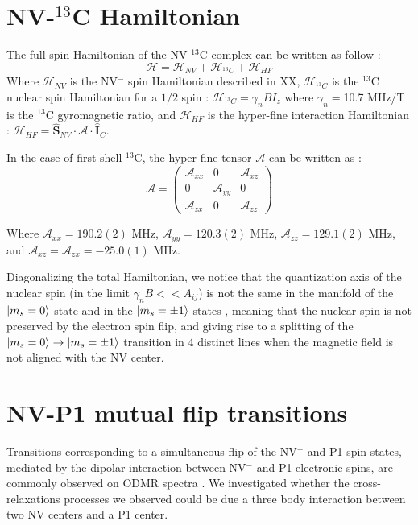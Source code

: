 \documentclass{article}
\begin{document}
\section{NV-$^{13}$C Hamiltonian}
The full spin Hamiltonian of the NV-$^{13}$C complex can be written as follow : 
\begin{equation*}
\mathcal{H}=\mathcal{H}_{NV}+\mathcal{H}_{^{13}C}+\mathcal{H}_{HF}
\end{equation*}
Where $\mathcal{H}_{NV}$ is the NV$^-$ spin Hamiltonian described in XX, $\mathcal{H}_{^{13}C}$ is the $^{13}$C nuclear spin Hamiltonian for a $1/2$ spin : $\mathcal{H}_{^{13}C}=\gamma_{n} B I_z$ where $\gamma_{n}=$10.7 MHz/T is the $^{13}$C gyromagnetic ratio, and $\mathcal{H}_{HF}$ is the hyper-fine interaction Hamiltonian : $\mathcal{H}_{HF}= \hat{\mathbf{S}}_{NV} \cdot \mathcal{A} \cdot \hat{\mathbf{I}}_C$.

In the case of first shell $^{13}$C, the hyper-fine tensor $\mathcal{A}$ can be written as \citep{simanovskaia_sidebands_2013} : $$ \mathcal{A} = \begin{pmatrix}
\mathcal{A}_{xx} & 0 & \mathcal{A}_{xz} \\ 0 & \mathcal{A}_{yy} & 0 \\ \mathcal{A}_{zx} & 0 & \mathcal{A}_{zz}
\end{pmatrix} $$

Where $\mathcal{A}_{xx}=190.2(2)$ MHz, $\mathcal{A}_{yy}=120.3(2)$ MHz, $\mathcal{A}_{zz}=129.1(2)$ MHz, and  $\mathcal{A}_{xz}=\mathcal{A}_{zx}=-25.0(1)$ MHz. 

Diagonalizing the total Hamiltonian, we notice that the quantization axis of the nuclear spin (in the limit $\gamma_{n} B << A_{ij}$) is not the same in the manifold of the $\ket{m_s=0}$ state and in the $\ket{m_s=\pm 1}$ states \citep{alvarez_local_2015}, meaning that the nuclear spin is not preserved by the electron spin flip, and giving rise to a splitting of the $\ket{m_s=0} \to \ket{m_s=\pm 1}$ transition in 4 distinct lines when the magnetic field is not aligned with the NV center. \citep{jiang2018estimation}

\section{NV-P1 mutual flip transitions}
Transitions corresponding to a simultaneous flip of the NV$^-$ and P1 spin states, mediated by the dipolar interaction between NV$^-$ and P1 electronic spins, are commonly observed on ODMR spectra \citep{simanovskaia_sidebands_2013} \citep{kamp2018continuous} \citep{alfasi2019detection} \citep{lazda2020cross}. We investigated whether the cross-relaxations processes we observed could be due a three body interaction between two NV centers and a P1 center.
\end{document}
